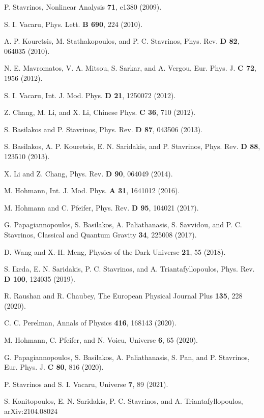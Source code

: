 \documentclass[aps,superscriptaddress, showpacs,preprintnumbers, superscriptaddress, nofootinbibt,twocolumn]{revtex4-2}
\begin{document}
\begin{thebibliography}{99}
 P. Stavrinos, Nonlinear Analysis {\bf 71},  e1380 (2009).

 S. I. Vacaru, Phys. Lett. {\bf B 690}, 224 (2010).

 A. P. Kouretsis, M. Stathakopoulos, and P. C. Stavrinos, Phys. Rev. {\bf D 82}, 064035 (2010).

 N. E. Mavromatos, V. A. Mitsou, S. Sarkar, and A. Vergou, Eur. Phys. J. {\bf C 72},  1956 (2012).

 S. I. Vacaru, Int. J. Mod. Phys. {\bf D 21},  1250072 (2012).

  Z. Chang, M. Li, and X. Li, Chinese Phys. {\bf C 36}, 710 (2012).

 S. Basilakos and P. Stavrinos, Phys. Rev. {\bf D 87},  043506 (2013).

 S. Basilakos, A. P. Kouretsis, E. N. Saridakis, and P. Stavrinos, Phys. Rev. {\bf D 88},  123510 (2013).

  X. Li and Z. Chang, Phys. Rev. {\bf D 90}, 064049 (2014).

 M. Hohmann, Int. J. Mod. Phys. {\bf A 31}, 1641012  (2016).

 M. Hohmann and C. Pfeifer, Phys. Rev. {\bf D 95}, 104021 (2017).

 G. Papagiannopoulos, S. Basilakos, A. Paliathanasis, S. Savvidou, and P. C. Stavrinos, Classical and Quantum Gravity {\bf 34}, 225008 (2017).

 D. Wang and  X.-H. Meng, Physics of the Dark Universe {\bf  21},  55 (2018).

 S. Ikeda, E. N. Saridakis, P. C. Stavrinos, and A. Triantafyllopoulos, Phys. Rev. {\bf D 100}, 124035 (2019).

     R. Raushan and R. Chaubey, The European Physical Journal Plus {\bf 135}, 228 (2020).

 C. C. Perelman, Annals of Physics {\bf 416}, 168143 (2020).

 M. Hohmann, C. Pfeifer, and N. Voicu, Universe {\bf  6},  65 (2020).

 G. Papagiannopoulos, S. Basilakos, A. Paliathanasis, S. Pan, and P. Stavrinos, Eur. Phys. J. {\bf C 80}, 816 (2020).

 P. Stavrinos  and S. I. Vacaru, Universe {\bf 7}, 89 (2021).

 S. Konitopoulos, E. N. Saridakis, P. C. Stavrinos, and A. Triantafyllopoulos,  arXiv:2104.08024


\end{thebibliography}
\end{document}
